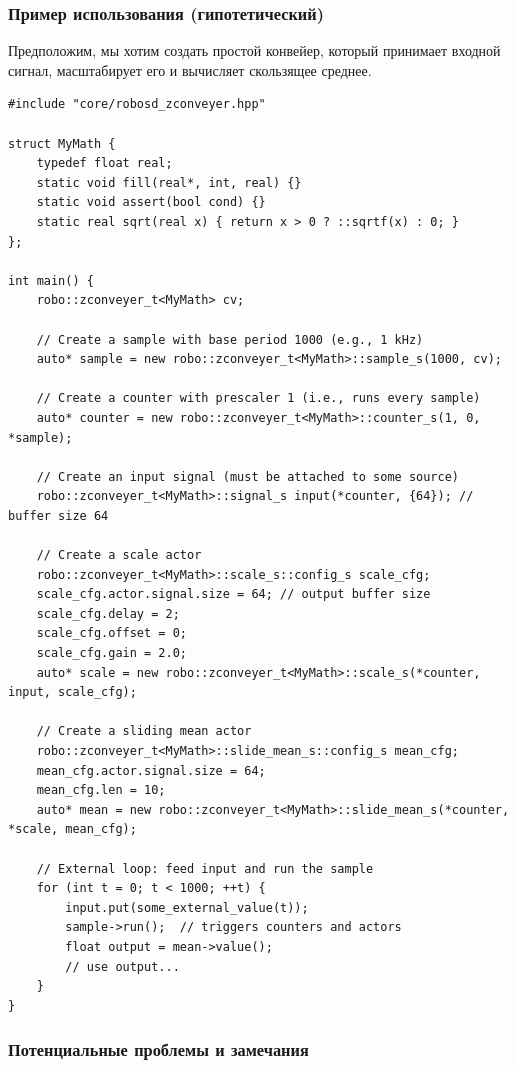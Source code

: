\documentclass[a4paper,12pt]{article}
\begin{document}
\subsubsection{Пример использования (гипотетический)}

Предположим, мы хотим создать простой конвейер, который принимает входной сигнал, масштабирует его и вычисляет скользящее среднее.

\begin{lstlisting}[caption={Simple signal processing pipeline}]
#include "core/robosd_zconveyer.hpp"

struct MyMath {
    typedef float real;
    static void fill(real*, int, real) {}
    static void assert(bool cond) {}
    static real sqrt(real x) { return x > 0 ? ::sqrtf(x) : 0; }
};

int main() {
    robo::zconveyer_t<MyMath> cv;

    // Create a sample with base period 1000 (e.g., 1 kHz)
    auto* sample = new robo::zconveyer_t<MyMath>::sample_s(1000, cv);

    // Create a counter with prescaler 1 (i.e., runs every sample)
    auto* counter = new robo::zconveyer_t<MyMath>::counter_s(1, 0, *sample);

    // Create an input signal (must be attached to some source)
    robo::zconveyer_t<MyMath>::signal_s input(*counter, {64}); // buffer size 64

    // Create a scale actor
    robo::zconveyer_t<MyMath>::scale_s::config_s scale_cfg;
    scale_cfg.actor.signal.size = 64; // output buffer size
    scale_cfg.delay = 2;
    scale_cfg.offset = 0;
    scale_cfg.gain = 2.0;
    auto* scale = new robo::zconveyer_t<MyMath>::scale_s(*counter, input, scale_cfg);

    // Create a sliding mean actor
    robo::zconveyer_t<MyMath>::slide_mean_s::config_s mean_cfg;
    mean_cfg.actor.signal.size = 64;
    mean_cfg.len = 10;
    auto* mean = new robo::zconveyer_t<MyMath>::slide_mean_s(*counter, *scale, mean_cfg);

    // External loop: feed input and run the sample
    for (int t = 0; t < 1000; ++t) {
        input.put(some_external_value(t));
        sample->run();  // triggers counters and actors
        float output = mean->value();
        // use output...
    }
}
\end{lstlisting}

\subsubsection{Потенциальные проблемы и замечания}
\end{document}
